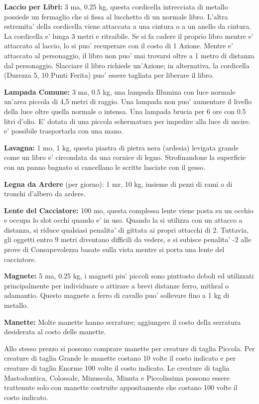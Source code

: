 \documentclass[a4paper,11pt,twoside,openany]{dndbook}
\begin{document}
{\textbf{Laccio per Libri:} 3 ma, 0.25 kg, questa cordicella intrecciata di metallo possiede un fermaglio che si fissa al lucchetto di un normale libro. L'altra estremita' della cordicella viene attaccata a una cintura o a un anello da cintura. La cordicella e' lunga 3 metri e ritraibile. Se si fa cadere il proprio libro mentre e' attaccato al laccio, lo si puo' recuperare con il costo di 1 Azione. Mentre e' attaccato al personaggio, il libro non puo' mai trovarsi oltre a 1 metro di distanza dal personaggio. Slacciare il libro richiede un'Azione; in alternativa, la cordicella (Durezza 5, 10 Punti Ferita) puo' essere tagliata per liberare il libro.

\textbf{Lampada Comune:} 3 ma, 0.5 kg, una lampada Illumina con luce normale un'area piccola di 4,5 metri di raggio. Una lampada non puo' aumentare il livello della luce oltre quella normale o intensa. Una lampada brucia per 6 ore con 0.5 litri d'olio. E' dotata di una piccola schermatura per impedire alla luce di uscire. e' possibile trasportarla con una mano.

\textbf{Lavagna:} 1 mo, 1 kg, questa piastra di pietra nera (ardesia) levigata grande come un libro e' circondata da una cornice di legno. Strofinandone la superficie con un panno bagnato si cancellano le scritte lasciate con il gesso.

\textbf{Legna da Ardere} (per giorno): 1 mr, 10 kg, insieme di pezzi di rami o di tronchi d'albero da ardere.

\textbf{Lente del Cacciatore:} 100 mo, questa complessa lente viene posta su un occhio e occupa lo slot occhi quando e' in uso. Quando la si utilizza con un attacco a distanza, si riduce qualsiasi penalita' di gittata ai propri attacchi di 2. Tuttavia, gli oggetti entro 9 metri diventano difficili da vedere, e si subisce penalita' -2 alle prove di Consapevolezza basate sulla vista mentre si porta una lente del cacciatore.

\textbf{Magnete:} 5 ma, 0.25 kg, i magneti piu' piccoli sono piuttosto deboli ed utilizzati principalmente per individuare o attirare a brevi distanze ferro, mithral o adamantio. Questo magnete a ferro di cavallo puo' sollevare fino a 1 kg di metallo. 

\textbf{Manette:} Molte manette hanno serrature; aggiungere il costo della serratura desiderata al costo delle manette.

Allo stesso prezzo si possono comprare manette per creature di taglia Piccola. Per creature di taglia Grande le manette costano 10 volte il costo indicato e per creature di taglia Enorme 100 volte il costo indicato. Le creature di taglia Mastodontica, Colossale, Minuscola, Minuta e Piccolissima possono essere trattenute solo con manette costruite appositamente che costano 100 volte il costo indicato.

}
\end{document}
